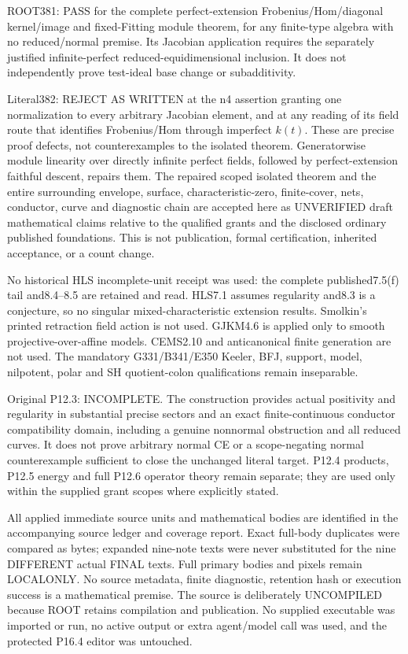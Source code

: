 \documentclass[11pt]{article}
\begin{document}
ROOT381: PASS for the complete perfect-extension Frobenius/Hom/diagonal kernel/image and fixed-Fitting module theorem, for any finite-type algebra with no reduced/normal premise. Its Jacobian application requires the separately justified infinite-perfect reduced-equidimensional inclusion. It does not independently prove test-ideal base change or subadditivity.

Literal382: REJECT AS WRITTEN at the n4 assertion granting one normalization to every arbitrary Jacobian element, and at any reading of its field route that identifies Frobenius/Hom through imperfect \(k(t)\). These are precise proof defects, not counterexamples to the isolated theorem. Generatorwise module linearity over directly infinite perfect fields, followed by perfect-extension faithful descent, repairs them. The repaired scoped isolated theorem and the entire surrounding envelope, surface, characteristic-zero, finite-cover, nets, conductor, curve and diagnostic chain are accepted here as UNVERIFIED draft mathematical claims relative to the qualified grants and the disclosed ordinary published foundations. This is not publication, formal certification, inherited acceptance, or a count change.

No historical HLS incomplete-unit receipt was used: the complete published7.5(f) tail and8.4--8.5 are retained and read. HLS7.1 assumes regularity and8.3 is a conjecture, so no singular mixed-characteristic extension results. Smolkin's printed retraction field action is not used. GJKM4.6 is applied only to smooth projective-over-affine models. CEMS2.10 and anticanonical finite generation are not used. The mandatory G331/B341/E350 Keeler, BFJ, support, model, nilpotent, polar and SH quotient-colon qualifications remain inseparable.

Original P12.3: INCOMPLETE. The construction provides actual positivity and regularity in substantial precise sectors and an exact finite-continuous conductor compatibility domain, including a genuine nonnormal obstruction and all reduced curves. It does not prove arbitrary normal CE or a scope-negating normal counterexample sufficient to close the unchanged literal target. P12.4 products, P12.5 energy and full P12.6 operator theory remain separate; they are used only within the supplied grant scopes where explicitly stated.

All applied immediate source units and mathematical bodies are identified in the accompanying source ledger and coverage report. Exact full-body duplicates were compared as bytes; expanded nine-note texts were never substituted for the nine DIFFERENT actual FINAL texts. Full primary bodies and pixels remain LOCALONLY. No source metadata, finite diagnostic, retention hash or execution success is a mathematical premise. The source is deliberately UNCOMPILED because ROOT retains compilation and publication. No supplied executable was imported or run, no active output or extra agent/model call was used, and the protected P16.4 editor was untouched.
\end{document}
